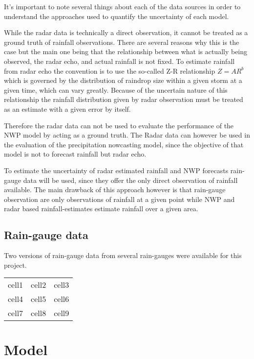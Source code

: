 It's important to note several things about each of the data sources in order to understand the approaches used to quantify the uncertainty of each model. 

While the radar data is technically a direct observation, it cannot be treated as a ground truth  of rainfall observations. There are several reasons why this is the case but the main one being that the relationship between what is actually being observed, the radar echo, and actual rainfall is not fixed. To estimate rainfall from radar echo the convention is to use the so-called Z-R relationship $Z=AR^b$ which is governed by the distribution of raindrop size within a given storm at a given time, which can vary greatly\cite{ZRrelationship}.  Because of the uncertain nature of this relationship the rainfall distribution given by radar observation must be treated as an estimate with a given error by itself.

Therefore the radar data can not be used to evaluate the performance of the NWP model by acting as a ground truth. The Radar data can however be used in the evaluation of the precipitation nowcasting model, since the objective of that model is not to forecast rainfall but radar echo. 

To estimate the uncertainty of radar estimated rainfall and NWP forecasts rain-gauge data will be used, since they offer the only direct observation of rainfall available. The main drawback of this approach however is that rain-gauge observation are only observations of rainfall at a given point while NWP and radar based rainfall-estimates estimate rainfall over a given area. 

\subsection{Rain-gauge data}
Two versions of rain-gauge data from several rain-gauges were available for this project. 

\begin{center}
\begin{tabular}{ c c c }
 cell1 & cell2 & cell3 \\ 
 cell4 & cell5 & cell6 \\  
 cell7 & cell8 & cell9    
\end{tabular}
\end{center}

\section{Model}


